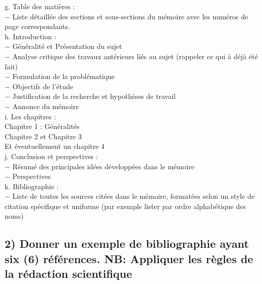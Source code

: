 \documentclass[12pt, a4paper, oneside]{book}
\begin{document}
	g. Table des matières :\\
	$-$ Liste détaillée des sections et sous-sections du mémoire avec les numéros de page correspondants.\\
	\newpage
	h. Introduction :\\
	$-$ Généralité et Présentation du sujet\\
	$-$ Analyse critique des travaux antérieurs liés au sujet (rappeler ce qui à déjà été fait)\\
	$-$ Formulation de la problématique\\
	$-$ Objectifs de l'étude\\
	$-$ Justification de la recherche et hypothèses de travail\\
	$-$ Annonce du mémoire\\
	
	i. Les chapitres :\\
	Chapitre 1 : Généralités\\
	Chapitre 2 et Chapitre 3 \\
	Et éventuellement un chapitre 4\\
	
	j. Conclusion et perspectives :\\
	$-$ Résumé des principales idées développées dans le mémoire\\
	$-$ Perspectives\\
	
	k. Bibliographie :\\
	$-$ Liste de toutes les sources citées dans le mémoire, formatées selon un style de citation spécifique et uniforme (par exemple lister par ordre alphabétique des noms)\\
	

	\subsection*{2) Donner un exemple de bibliographie ayant six (6) références. NB: Appliquer les règles de la rédaction scientifique}
\end{document}
